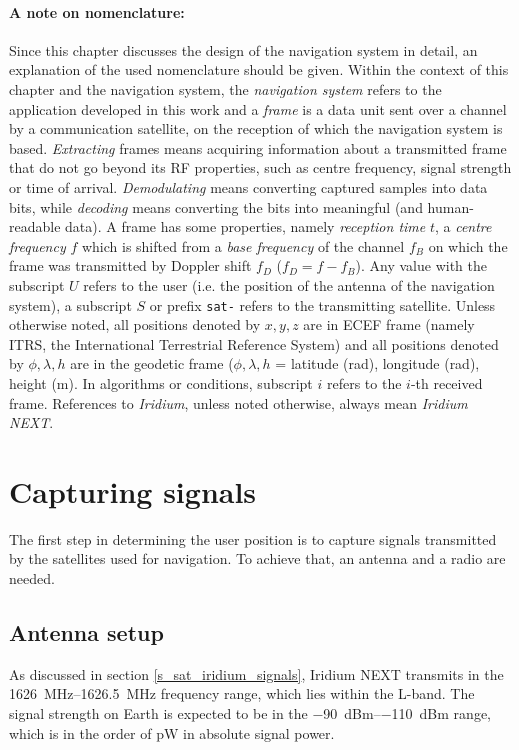 \paragraph{A note on nomenclature:} Since this chapter discusses the design of the navigation system in detail, an explanation of the used nomenclature should be given. Within the context of this chapter and the navigation system, the \textit{navigation system} refers to the application developed in this work and a \textit{frame} is a data unit sent over a channel by a communication satellite, on the reception of which the navigation system is based. \textit{Extracting} frames means acquiring information about a transmitted frame that do not go beyond its RF properties, such as centre frequency, signal strength or time of arrival. \textit{Demodulating} means converting captured samples into data bits, while \textit{decoding} means converting the bits into meaningful (and human-readable data). A frame has some properties, namely \textit{reception time} $t$, a \textit{centre frequency} $f$ which is shifted from a \textit{base frequency} of the channel $f_B$ on which the frame was transmitted by Doppler shift $f_D$ ($f_D = f - f_B$). Any value with the subscript $U$ refers to the user (i.e. the position of the antenna of the navigation system), a subscript $S$ or prefix \texttt{sat-} refers to the transmitting satellite. Unless otherwise noted, all positions denoted by $x, y, z$ are in ECEF frame (namely ITRS, the International Terrestrial Reference System) and all positions denoted by $\phi, \lambda, h$ are in the geodetic frame ($\phi, \lambda, h$ = latitude (rad), longitude (rad), height (m). In algorithms or conditions, subscript $i$ refers to the $i$-th received frame. References to \textit{Iridium}, unless noted otherwise, always mean \textit{Iridium NEXT}.


\section{Capturing signals}
The first step in determining the user position is to capture signals transmitted by the satellites used for navigation. To achieve that, an antenna and a radio are needed.

\subsection{Antenna setup}
As discussed in section \ref{s_sat_iridium_signals}, Iridium NEXT transmits in the \qtyrange{1626}{1626.5}{\MHz} frequency range, which lies within the L-band. The signal strength on Earth is expected to be in the \qtyrange{-90}{-110}{dBm} range\cite{sop01}, which is in the order of \unit{pW} in absolute signal power.

